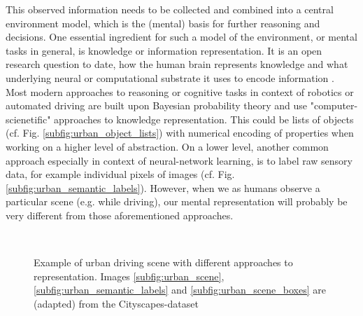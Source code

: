 This observed information needs to be collected and combined into a central environment model, which is the (mental) basis for further reasoning and decisions.
One essential ingredient for such a model of the environment, or mental tasks in general, is knowledge or information representation.
It is an open research question to date, how the human brain represents knowledge and what underlying neural or computational substrate it uses to encode information \cite{Wang2003, Samsonovich2012, Handjaras2016}.
Most modern approaches to reasoning or cognitive tasks in context of robotics or automated driving are built upon Bayesian probability theory and use "computer-scienetific" approaches to knowledge representation.
This could be lists of objects (cf. Fig. \ref{subfig:urban_object_lists}) with numerical encoding of properties when working on a higher level of abstraction.
On a lower level, another common approach especially in context of neural-network learning, is to label raw sensory data, for example individual pixels of images (cf. Fig. \ref{subfig:urban_semantic_labels}).
However, when we as humans observe a particular scene (e.g. while driving), our mental representation will probably be very different from those aforementioned approaches.
\begin{figure}[t!]
	\centering
	\\
	\caption{Example of urban driving scene with different approaches to representation. Images \ref{subfig:urban_scene}, \ref{subfig:urban_semantic_labels} and \ref{subfig:urban_scene_boxes} are (adapted) from the Cityscapes-dataset \cite{Cordts2016}}\label{fig:urban_scene}
\end{figure}
